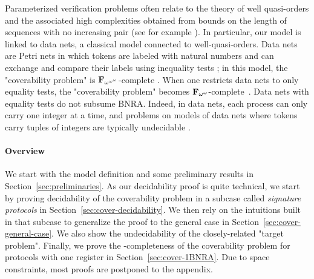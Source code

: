 Parameterized verification problems often relate to the theory of well quasi-orders
and the associated high complexities obtained from bounds on the length of sequences with no increasing pair (see for example \cite{WSTS}). 
In particular, our model is linked to data nets, a classical model connected to well-quasi-orders. Data nets are Petri nets in which tokens are labeled with natural numbers and can exchange and compare their labels using inequality tests \cite{LazicNORW08}; in this model, the "coverability problem" is $\mathbf{F}_{\omega^{\omega^{\omega}}}$-complete \cite{datanetsinequalityfomegaomegaomega}. When one restricts data nets to only equality tests, the "coverability problem" becomes $\mathbf{F}_{\omega^{\omega}}$-complete~\cite{Rosa-Velardo17}. Data nets with equality tests do not subsume BNRA. Indeed, in data nets, each process can only carry one integer at a time, and problems on models of data nets where tokens carry tuples of integers are typically undecidable \cite{Lasota16}.

\paragraph*{Overview}
We start with the model definition and some preliminary results in Section~\ref{sec:preliminaries}. As our decidability proof is quite technical, we start by proving decidability of the coverability problem in a subcase called \emph{signature protocols} in Section~\ref{sec:cover-decidability}.
We then rely on the intuitions built in that subcase to generalize the proof to the general case in Section~\ref{sec:cover-general-case}. We also show the undecidability of the closely-related "target problem".
Finally, we prove the \NP-completeness of the coverability problem for protocols with one register in Section~\ref{sec:cover-1BNRA}.
Due to space constraints, most proofs are postponed to the appendix.

